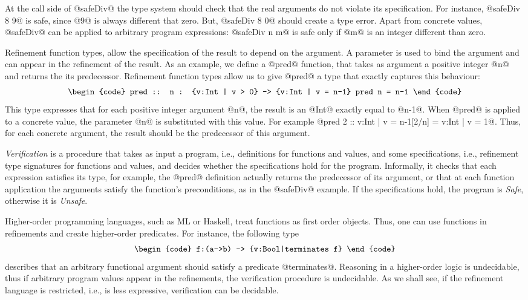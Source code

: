 At the call side of @safeDiv@ 
the type system should check that the real arguments do not
violate its specification.
%
For instance, 
@safeDiv 8 9@ is safe, since @9@ is always different that zero.
But, @safeDiv 8 0@ should create a type error.
Apart from concrete values, @safeDiv@ can be applied to arbitrary program expressions:
@safeDiv n m@ is safe only if 
@m@ is an integer different than zero.

Refinement function types\cite{cayenne, flanagan06}, allow the specification of the 
result to depend on the argument.
%
A parameter is used to bind the argument
and can appear in the refinement of the result.
%
As an example, we define a @pred@ function, 
that takes as argument a positive integer @n@ and returns the its predecessor.
Refinement function types allow us to give @pred@ a type
that exactly captures this behaviour:
%
$$\centering\begin{tabular}{c}\begin{code}
pred :: n : {v:Int | v > 0} -> {v:Int | v = n-1}
pred n = n-1
\end{code}\end{tabular}$$
%
This type expresses that for each positive integer argument @n@, 
the result is an @Int@ exactly equal to @n-1@.
When @pred@ is applied to a concrete value, 
the parameter @n@ is substituted with this value.
For example @pred 2 :: {v:Int | v = n-1}[2/n] = {v:Int | v = 1}@.
Thus, for each concrete argument, the result should be the predecessor 
of this argument.

\textit{Verification} is a procedure that takes as input 
a program, i.e.,  definitions for functions and values,
and some specifications, i.e., refinement type signatures for functions and values,
and decides whether the specifications hold for the program.
%
Informally, it checks that 
each expression satisfies its type, 
for example, the @pred@ definition actually returns the 
predecessor of its argument,
or that 
at each function application the arguments satisfy
the function's preconditions, 
as in the @safeDiv@ example.
%
If the specifications hold, the program is \textit{Safe}, 
otherwise it is \textit{Unsafe}. 

Higher-order programming languages, such as ML or Haskell, 
treat functions as first order objects.
Thus, one can use functions in refinements and 
create higher-order predicates. 
For instance, the following type
%
$$\centering\begin{tabular}{c}\begin{code}
f:(a->b) -> {v:Bool|terminates f}
\end{code}\end{tabular}$$
%
describes that an arbitrary functional argument
should satisfy a predicate @terminates@.
%
Reasoning in a higher-order logic is undecidable, 
thus if arbitrary program values appear in the refinements,
the verification procedure is undecidable.
%
As we shall see, 
if the refinement language is restricted, i.e., is less expressive,
verification can be decidable.

